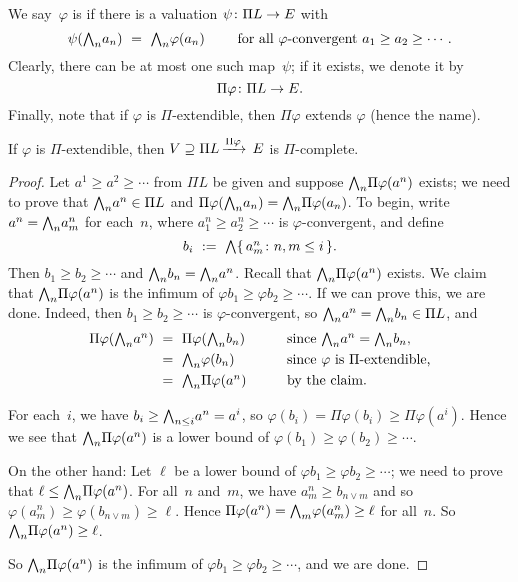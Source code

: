 \documentclass[main.tex]{subfiles}
\begin{document}
\begin{dfn}
\label{D:Pi-extendible}
We say~$\varphi$ is 
if there is a valuation $\psi \colon \Pi L \rightarrow E$ with
\begin{equation*}
\psi ( \bw_n a_n )
\ =\ 
\bw_n \varphi(a_n) 
\qquad
\text{ for all $\varphi$-convergent }
a_1 \geq a_2 \geq \dotsb.
\end{equation*}
Clearly,
there can be at most one such map~$\psi$;
if it exists, we denote it by 
\begin{equation*}
\Pi \varphi\colon \Pi L \rightarrow E.
\end{equation*}
Finally,
note that if $\varphi$ is $\Pi$-extendible,
then $\Pi\varphi$ extends $\varphi$ (hence the name).
\end{dfn}
%
%
\begin{lem}
\label{L:Pi-complete}
If $\varphi$ is $\Pi$-extendible,
then $V \supseteq \Pi L\,\smash{\xrightarrow{\Pi\varphi}\,E}$ is $\Pi$-complete.
\end{lem}
\begin{proof}
Let $a^1 \geq a^2 \geq \dotsb $ from $\Pi L$
be given and suppose  $\textstyle{\bigwedge}_n \Pi \varphi (a^n)$ exists;
we need to prove that $\textstyle{\bigwedge}_n a^n \in \Pi L$
and $\Pi\varphi(\textstyle{\bigwedge}_n a_n) = \textstyle{\bigwedge}_n \Pi \varphi(a_n )$.
To begin, write
$a^n = \textstyle{\bigwedge}_n a^n_m$
for each~$n$,
where $a^n_1 \geq a^n_2 \geq \dotsb$
is $\varphi$-convergent, and define
\begin{equation*}
b_i \ :=\ \textstyle{\bigwedge}\{\,a^n_m\colon n,m\leq i \,\}.
\end{equation*}
Then $b_1 \geq b_2 \geq \dotsb$
and $\textstyle{\bigwedge}_n b_n = \textstyle{\bigwedge}_n a^n$.
Recall that  $\textstyle{\bigwedge}_n \Pi\varphi(a^n)$
exists.
We claim that $\textstyle{\bigwedge}_n \Pi\varphi(a^n)$
is the infimum of $\varphi b_1 \geq \varphi b_2 \geq \dotsb$.
If we can prove this, we are done.
Indeed,
then $b_1 \geq b_2 \geq\dotsb$ is $\varphi$-convergent,
so $\textstyle{\bigwedge}_n a^n = \textstyle{\bigwedge}_n b_n \in \Pi L$,
and
\begin{alignat*}{3}
\Pi\varphi( \textstyle{\bigwedge}_n a^n ) \ &=\  \Pi\varphi( \textstyle{\bigwedge}_n b_n )
 \qquad&& \text{since $\textstyle{\bigwedge}_n a^n = \textstyle{\bigwedge}_n b_n$}, \\
&=\ \textstyle{\bigwedge}_n \varphi (b_n)  
  && \text{since $\varphi$ is $\Pi$-extendible,}\\
&=\ \textstyle{\bigwedge}_n \Pi\varphi(a^n) 
  && \text{by the claim.}
\end{alignat*}

For each~$i$,
we have $b_i \geq \textstyle{\bigwedge}_{n\leq i} a^n = a^i$,
so $\varphi(b_i) = \Pi\varphi(b_i) \geq \Pi\varphi(a^i)$.
Hence we see that
$\textstyle{\bigwedge}_n \Pi\varphi(a^n)$ is a lower bound of
$\varphi(b_1)\geq \varphi(b_2) \geq \dotsb$.

On the other hand:
Let $\ell$ be a lower bound of $\varphi b_1 \geq \varphi b_2 \geq \dotsb$;
we need to prove that $\ell \leq \textstyle{\bigwedge}_n \Pi\varphi(a^n)$.
For all~$n$ and~$m$,
we have $a_m^n \geq b_{n\vee m}$
and so $\varphi(a_m^n) \geq \varphi(b_{n\vee m}) \geq \ell$.
Hence $\Pi\varphi(a^n) = \textstyle{\bigwedge}_m \varphi(a_m^n) \geq \ell$
for all~$n$.
So $\textstyle{\bigwedge}_n \Pi\varphi(a^n) \geq \ell$.

So $\textstyle{\bigwedge}_n \Pi\varphi(a^n)$ is the infimum of 
$\varphi b_1 \geq \varphi b_2 \geq \dotsb$,
and we are done.
\end{proof}
\end{document}
